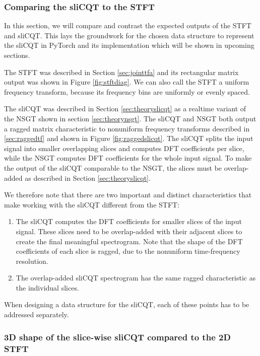 \documentclass[report.tex]{subfiles}
\begin{document}
\subsubsection{Comparing the sliCQT to the STFT}
\label{sec:stftslicqtcomp}

In this section, we will compare and contrast the expected outputs of the STFT and sliCQT. This lays the groundwork for the chosen data structure to represent the sliCQT in PyTorch and its implementation which will be shown in upcoming sections.

The STFT was described in Section \ref{sec:jointtfa} and its rectangular matrix output was shown in Figure \ref{fig:stftdiag}. We can also call the STFT a uniform frequency transform, because its frequency bins are uniformly or evenly spaced.

The sliCQT was described in Section \ref{sec:theoryslicqt} as a realtime variant of the NSGT shown in section \ref{sec:theorynsgt}. The sliCQT and NSGT both output a ragged matrix characteristic to nonuniform frequency transforms described in \ref{sec:raggedtf} and shown in Figure \ref{fig:raggedslicqt}. The sliCQT splits the input signal into smaller overlapping slices and computes DFT coefficients per slice, while the NSGT computes DFT coefficients for the whole input signal. To make the output of the sliCQT comparable to the NSGT, the slices must be overlap-added as described in Section \ref{sec:theoryslicqt}.

We therefore note that there are two important and distinct characteristics that make working with the sliCQT different from the STFT:
\begin{enumerate}
	\item
		The sliCQT computes the DFT coefficients for smaller slices of the input signal. These slices need to be overlap-added with their adjacent slices to create the final meaningful spectrogram. Note that the shape of the DFT coefficients of each slice is ragged, due to the nonuniform time-frequency resolution.
	\item
		The overlap-added sliCQT spectrogram has the same ragged characteristic as the individual slices.
\end{enumerate}

When designing a data structure for the sliCQT, each of these points has to be addressed separately. 

\subsubsection{3D shape of the slice-wise sliCQT compared to the 2D STFT}
\label{sec:stftslicqtcomp1}
\end{document}
